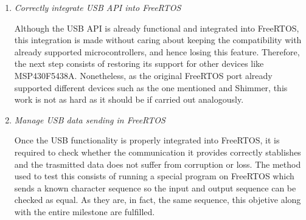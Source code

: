 \begin{enumerate}
			\item \emph{Correctly integrate USB API into FreeRTOS}\\
				\begin{comment}
				Once it's done our preocupation was how to order all this files in a correct way, because our
				free RTOS was a multiplatform SO that must work in MSP430 5438A, Shimmer, and now, the new MSP430
				6638 where take place this develope. In the first port where the multiplatform ability of
				FreeRTOS was not a problem we lost this funcionality. This separation of tasks help pretty much
				in focus the first steps in this milestone. This new functionality have to be included just in
				the supported platform, the MSP430 6638, without affect the other ones as before. Using the
				preciding generalization needed to cohexists Shimmer and MSP430 5438A as a guide this port was
				not too traumatic.
				\end{comment}
				Although the USB API is already functional and integrated into FreeRTOS, this integration is made
				without caring about keeping the compatibility with already supported microcontrollers, and hence
				losing this feature. Therefore, the next step consists of restoring its support for other devices
				like MSP430F5438A. Nonetheless, as the original FreeRTOS port already supported different devices
				such as the one mentioned and Shimmer\texttrademark, this work is not as hard as it should be if
				carried out analogously.

			\item \emph{Manage USB data sending in FreeRTOS}\\
				\begin{comment}
				Finally with the USB API correctly integrate and its functionality validated, the implementacion
				of a closer program to the expected funcitionality of the device was attempted, sending a already
				know character secuence of 1 byte long, and checking that it's been recived in the other side.
				This test was satisfactory and the milestone was finally achieved.
				\end{comment}
				Once the USB functionality is properly integrated into FreeRTOS, it is required to check whether
				the communication it provides correctly stablishes and the trasmitted data does not suffer from
				corruption or loss. The method used to test this consists of running a special program on FreeRTOS
				which sends a known character sequence so the input and output sequence can be checked as equal.
				As they are, in fact, the same sequence, this objetive along with the entire milestone are
				fulfilled.
		\end{enumerate}

